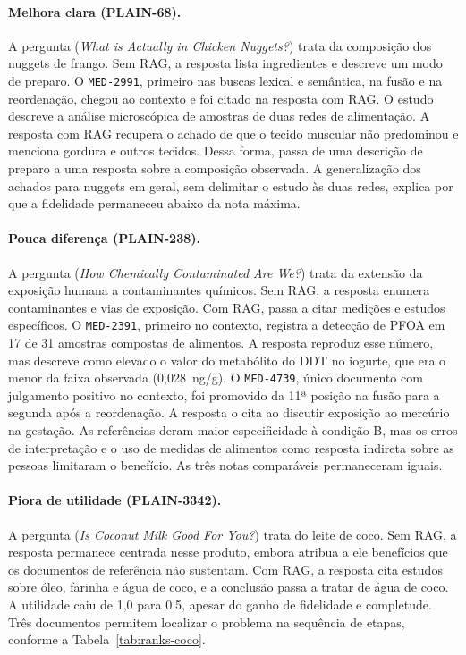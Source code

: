 \documentclass[12pt]{article}
\begin{document}
\paragraph{Melhora clara (PLAIN-68).}
A pergunta (\textit{What is Actually in Chicken Nuggets?}) trata da composição
dos nuggets de frango. Sem RAG, a resposta
lista ingredientes e descreve um modo de preparo. O
\texttt{MED-2991}, primeiro nas buscas lexical e semântica, na fusão e
na reordenação, chegou ao contexto e foi citado na resposta com RAG.
O estudo descreve a análise microscópica de amostras de duas redes de
alimentação. A resposta com RAG recupera o achado de que o tecido muscular
não predominou e menciona gordura e outros tecidos. Dessa forma, passa de
uma descrição de preparo a uma resposta sobre a composição observada.
A generalização dos achados para nuggets em geral, sem delimitar o estudo
às duas redes, explica por que a fidelidade permaneceu abaixo da nota máxima.

\paragraph{Pouca diferença (PLAIN-238).}
A pergunta (\textit{How Chemically Contaminated Are We?}) trata da extensão da
exposição humana a contaminantes químicos.
Sem RAG, a resposta enumera contaminantes e vias de exposição. Com RAG,
passa a citar medições e estudos específicos. O \texttt{MED-2391}, primeiro
no contexto, registra a detecção de PFOA em 17 de 31 amostras compostas de
alimentos. A resposta reproduz esse número, mas descreve como elevado o
valor do metabólito do DDT no iogurte, que era o menor da faixa observada
(0,028~ng/g). O \texttt{MED-4739}, único documento com julgamento positivo
no contexto, foi promovido da 11ª posição na fusão para a segunda após a
reordenação. A resposta o cita ao discutir exposição ao mercúrio na
gestação. As referências deram maior especificidade à condição B, mas os
erros de interpretação e o uso de medidas de alimentos como resposta
indireta sobre as pessoas limitaram o benefício. As três notas comparáveis
permaneceram iguais.

\paragraph{Piora de utilidade (PLAIN-3342).}
A pergunta (\textit{Is Coconut Milk Good For You?}) trata do leite de coco. Sem RAG, a resposta permanece centrada
nesse produto, embora atribua a ele benefícios que os documentos de
referência não sustentam. Com RAG, a resposta cita estudos sobre óleo,
farinha e água de coco, e a conclusão passa a tratar de água de coco.
A utilidade caiu de 1,0 para 0,5, apesar do ganho de fidelidade e
completude. Três documentos permitem localizar o problema na sequência
de etapas, conforme a Tabela~\ref{tab:ranks-coco}.
\end{document}
